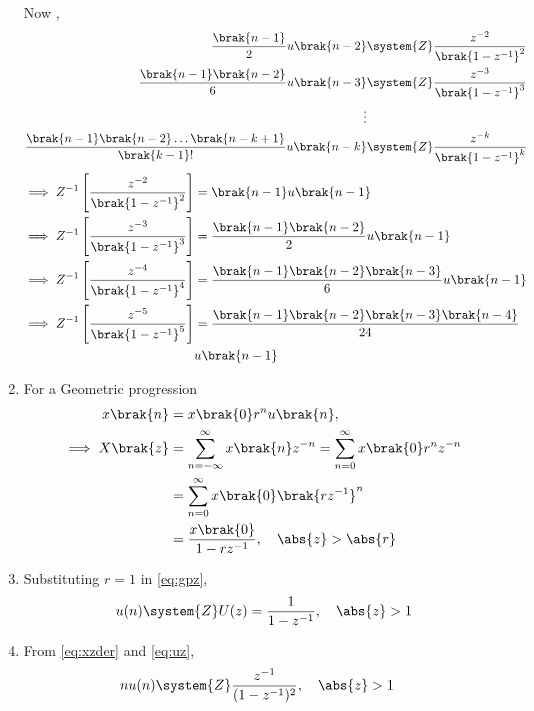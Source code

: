 \begin{enumerate}[label=\thesubsection.\arabic*,ref=\thesubsection.\theenumi]
 Now , 
    \begin{align}
         \frac{\brak{n-1}}{2}u\brak{n-2} & \system{Z} \frac{z^{-2}}{\brak{1-z^{-1}}^2} \\
         \frac{\brak{n-1}\brak{n-2}}{6}u\brak{n-3}&\system{Z} \frac{z^{-3}}{\brak{1-z^{-1}}^3}\\
         \vdots \notag \\
          \frac{\brak{n-1}\brak{n-2}\ldots \brak{n-k+1}}{\brak{k-1}!}u\brak{n-k}&\system{Z} \frac{z^{-k}}{\brak{1-z^{-1}}^k}\label{eq:11.9.5.26.8}
    \end{align}
\begin{align}
    \implies    Z^{-1}\left[\frac{z^{-2}}{\brak{1-z^{-1}}^2}\right]&=\brak{n-1}u\brak{n-1}\label{eq:11.9.5.26.9} \\
     \implies     Z^{-1}\left[\frac{z^{-3}}{\brak{1-z^{-1}}^3}\right]&=\frac{\brak{n-1}\brak{n-2}}{2}u\brak{n-1}\label{eq:11.9.5.26.10} \\
    \implies      Z^{-1}\left[\frac{z^{-4}}{\brak{1-z^{-1}}^4}\right]&=\frac{\brak{n-1}\brak{n-2}\brak{n-3}}{6}u\brak{n-1}\label{eq:11.9.5.26.11} \\
    \implies      Z^{-1}\left[\frac{z^{-5}}{\brak{1-z^{-1}}^5}\right]&=\frac{\brak{n-1}\brak{n-2}\brak{n-3}\brak{n-4}}{24}\label{eq:11.9.5.26.12}\\ &u\brak{n-1} \notag 
    \end{align}
\item For a Geometric progression 
\begin{align}
	       \label{eq:gpn}
	x\brak{n} &=x\brak{0}r^nu\brak{n},
	\\
         \implies      X\brak{z} &= \sum_{n=-\infty}^{\infty}x\brak{n}z^{-n}
               =\sum_{n=0}^{\infty}x\brak{0}r^nz^{-n}\\
                &=\sum_{n=0}^{\infty}x\brak{0}\brak{rz^{-1}}^n\\
               &= \frac{x\brak{0}}{1-rz^{-1}}, \quad \abs{z}>\abs{r} 
	       \label{eq:gpz}
\end{align}
\item 	       Substituting $r = 1$ in \eqref{eq:gpz},
\begin{align}
	u(n) \system{Z}	U(z) = 
                \frac{1}{1-z^{-1}}, \quad \abs{z}>1
	       \label{eq:uz}
\end{align}
\item From 
\eqref{eq:xzder}
	       and 
	       \eqref{eq:uz},
\begin{align}
nu(n) &\system{Z}\frac{z^{-1}}{(1-z^{-1})^{2}}, \quad \abs{z} > 1 

\end{align}
\end{enumerate}
